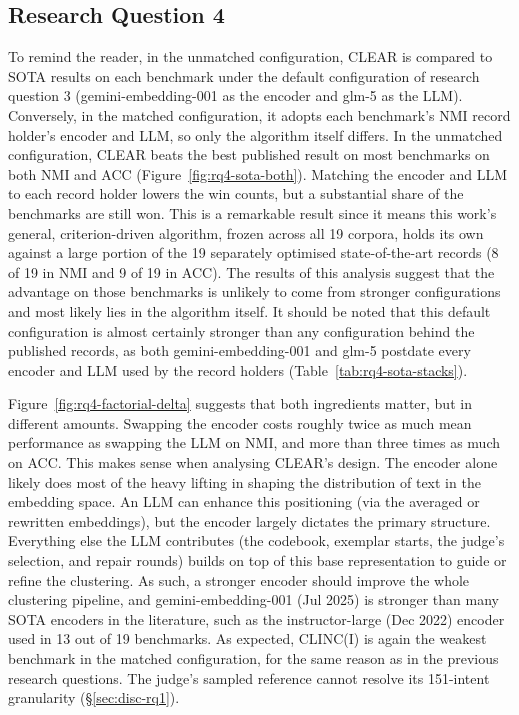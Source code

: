 \documentclass[11pt,a4paper,oneside]{report}
\begin{document}
\subsection{Research Question 4}

To remind the reader, in the unmatched configuration, CLEAR is compared to SOTA results on each benchmark under the default configuration of research question 3 ({\small\ttfamily gemini-embedding-001} as the encoder and {\small\ttfamily glm-5} as the LLM). Conversely, in the matched configuration, it adopts each benchmark's NMI record holder's encoder and LLM, so only the algorithm itself differs. In the unmatched configuration, CLEAR beats the best published result on most benchmarks on both NMI and ACC (Figure~\ref{fig:rq4-sota-both}). Matching the encoder and LLM to each record holder lowers the win counts, but a substantial share of the benchmarks are still won. This is a remarkable result since it means this work's general, criterion-driven algorithm, frozen across all 19 corpora, holds its own against a large portion of the 19 separately optimised state-of-the-art records (8 of 19 in NMI and 9 of 19 in ACC). The results of this analysis suggest that the advantage on those benchmarks is unlikely to come from stronger configurations and most likely lies in the algorithm itself. It should be noted that this default configuration is almost certainly
stronger than any configuration behind the published records, as both
{\small\ttfamily gemini-embedding-001} and {\small\ttfamily glm-5}
postdate every encoder and LLM used by the record holders
(Table~\ref{tab:rq4-sota-stacks}).

Figure~\ref{fig:rq4-factorial-delta} suggests that both ingredients matter, but in different amounts. Swapping the encoder costs roughly twice as much mean performance as swapping the LLM on NMI, and more than three times as much on ACC. This makes sense when analysing CLEAR's design. The encoder alone likely does most of the heavy lifting in shaping the distribution of text in the embedding space. An LLM can enhance this positioning (via the averaged or rewritten embeddings), but the encoder largely dictates the primary structure. Everything else the LLM contributes (the codebook, exemplar starts, the judge's selection, and repair rounds) builds on top of this base representation to guide or refine the clustering. As such, a stronger encoder should improve the whole clustering pipeline, and {\small\ttfamily gemini-embedding-001} (Jul 2025) is stronger than many SOTA encoders in the literature, such as the {\small\ttfamily instructor-large} (Dec 2022) encoder used in 13 out of 19 benchmarks. As expected, CLINC(I) is again the weakest benchmark in the matched configuration, for the same reason as in the previous research questions. The judge's sampled reference cannot resolve its 151-intent granularity (\S\ref{sec:disc-rq1}).
\end{document}

